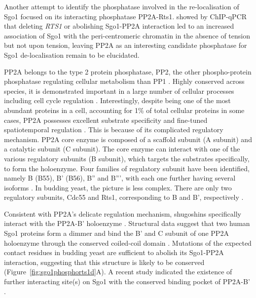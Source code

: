 Another attempt to identify the phosphatase involved in the re-localisation of Sgo1 focused on its interacting phosphatase PP2A-Rts1. \cite{Nerusheva2014} showed by ChIP-qPCR that deleting \textit{RTS1} or abolishing Sgo1-PP2A interaction led to an increased association of Sgo1 with the peri-centromeric chromatin in the absence of tension but not upon tension, leaving PP2A as an interesting candidate phosphatase for Sgo1 de-localisation remain to be elucidated. 

PP2A belongs to the type 2 protein phosphatase, PP2, the other phospho-protein phosphatase regulating cellular metabolism than PP1 \citep{Ingebritsen1983ProteinRegulation}. Highly conserved across species, it is demonstrated important in a large number of cellular processes including cell cycle regulation \citep{Janssens2001ProteinSignalling}. Interestingly, despite being one of the most abundant proteins in a cell, accounting for 1\% of total cellular proteins in some cases, PP2A possesses excellent substrate specificity and fine-tuned spatiotemporal regulation \citep{Shi2009Serine/threonineStructure}. This is because of its complicated regulatory mechanism. PP2A core enzyme is composed of a scaffold subunit (A subunit) and a catalytic subunit (C subunit). The core enzyme can interact with one of the various regulatory subunits (B subunit), which targets the substrates specifically, to form the holoenzyme. Four families of regulatory subunit have been identified, namely B (B55), B' (B56), B'' and B''', with each one further having several isoforms \citep{Shi2009Serine/threonineStructure}. In budding yeast, the picture is less complex. There are only two regulatory subunits, Cdc55 and Rts1, corresponding to B and B', respectively \citep{Zhao1997SaccharomycesFunctions}. 

Consistent with PP2A's delicate regulation mechanism, shugoshins specifically interact with the PP2A-B' holoenzyme \citep{Kitajima2006a, Riedel2006, Tang2006a}. Structural data suggest that two human Sgo1 proteins form a dimmer and bind the B' and C subunit of one PP2A holoenzyme through the conserved coiled-coil domain \citep{Xu2009StructureInteraction}. Mutations of the expected contact residues in budding yeast are sufficient to abolish its Sgo1-PP2A interaction, suggesting that this structure is likely to be conserved (Figure~\ref{fig:sgo1phosphorts1d}A). A recent study indicated the existence of further interacting site(s) on Sgo1 with the conserved binding pocket of PP2A-B' \citep{Ueki2021AMitosis}. 

